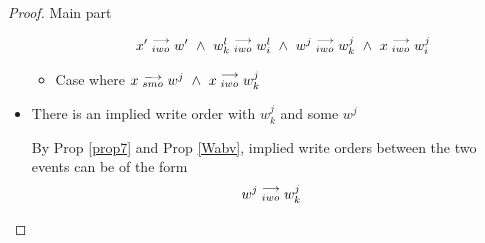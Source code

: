 \begin{proof}{Main part}
\begin{itemize}
\begin{itemize}
                                \begin{align*}
                                    \reln{x'}{iwo}{w'} \ \wedge \ \reln{w_k^l}{iwo}{w_i^l} \ \wedge \ \reln{w^j}{iwo}{w_k^j} \ \wedge \ \reln{x}{iwo}{w_i^j} 
                                \end{align*}


                            \item Case where $x\stackrel{\longrightarrow}{_{smo}}w^j \ \wedge \ x\stackrel{\longrightarrow}{_{iwo}}w_k^j$
                        \end{itemize}



                    \item There is an implied write order with $w_k^j$ and some $w^j$

                        By Prop \ref{prop7} and Prop \ref{Wabv}, implied write orders between the two events can be of the form 
                        \begin{align*}
                            w^j\stackrel{\longrightarrow}{_{iwo}}w_k^j  
                        \end{align*}


\end{itemize}
\end{proof}
